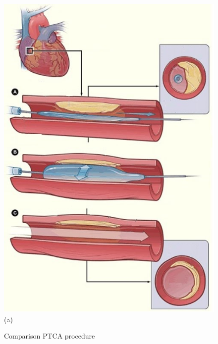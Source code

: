 \begin{figure}[H]
     \caption{Comparison PTCA procedure}
     \begin{minipage}{.50\linewidth}
      \centering
      \includegraphics[scale=0.5]{./02_chaps/cap_review/figure/balloon.jpg}\\
      (a)
     \end{minipage}%
     \begin{minipage}{.50\linewidth}
      \centering

\end{minipage}
\end{figure}
